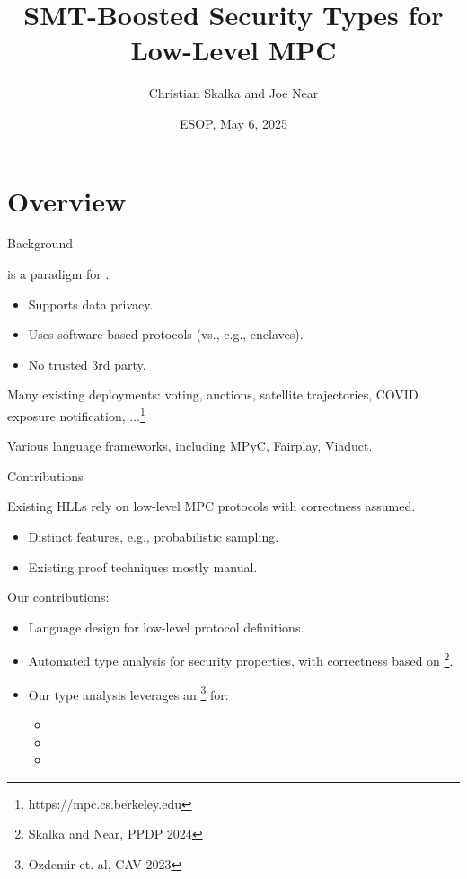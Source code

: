 \documentclass{beamer}
\title{SMT-Boosted Security Types for Low-Level MPC}
\author{Christian Skalka and Joe Near}
\date{ESOP, May 6, 2025}
\begin{document}
\begin{frame}
    \titlepage 
\end{frame}

\logo{}



\section{Overview}

\begin{frame}{Background}
  
   is a paradigm for
  .
  \begin{itemize}
  \item Supports data privacy.
  \item Uses software-based protocols (vs., e.g., enclaves).
  \item No trusted 3rd party.
  \end{itemize}
  Many existing deployments: voting, auctions, satellite trajectories, COVID exposure notification, ...\footnote{https://mpc.cs.berkeley.edu}

  \medskip

  Various language frameworks, including MPyC, Fairplay, Viaduct.
\end{frame}

\begin{frame}{Contributions}

  Existing HLLs rely on low-level MPC protocols with correctness
  assumed.
  \begin{itemize}
  \item Distinct features, e.g., probabilistic sampling.
  \item Existing proof techniques mostly manual.
  \end{itemize}
  Our contributions:
  \begin{itemize}
  \item Language design for low-level protocol definitions.
  \item Automated type analysis for security properties, with correctness based on
    \footnote{Skalka and Near, PPDP 2024}.
  \item Our type analysis leverages an \footnote{Ozdemir et. al, CAV 2023} for:
    \begin{itemize}
    \item {}
    \item {}
    \item {}
    \end{itemize}
  \end{itemize}
  
\end{frame}
\end{document}
